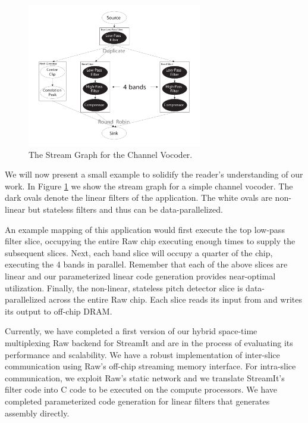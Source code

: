\documentclass{csailabstractbook}
\begin{document}
\begin{figure}[tbh]
	\vspace{-.2in}
  \centerline{\includegraphics[width=3.0in]{mgordon_figure1.pdf}}
	\vspace{-.2in}
  \caption{The Stream Graph for the Channel Vocoder.}
	\vspace{-.2in}
  \label{streamgraph}
\end{figure}


   
We will now present a small example to solidify the reader's
understanding of our work.  In Figure \ref{streamgraph} we show the
stream graph for a simple channel vocoder.  The dark ovals denote
the linear filters of the application.  The white ovals are non-linear
but stateless filters and thus can be data-parallelized.  

An example mapping of this application would first execute the top
low-pass filter slice, occupying the entire Raw chip executing enough
times to supply the subsequent slices. Next, each band slice will
occupy a quarter of the chip, executing the 4 bands in parallel.  Remember
that each of the above slices are linear and our parameterized linear
code generation provides near-optimal utilization. Finally, the
non-linear, stateless pitch detector slice is data-parallelized across
the entire Raw chip. Each slice reads its input from and writes its output
to off-chip DRAM.
 
Currently, we have completed a first version of our hybrid space-time
multiplexing Raw backend for StreamIt and are in the process of
evaluating its performance and scalability.  We have a robust
implementation of inter-slice communication using Raw's off-chip
streaming memory interface.  For intra-slice communication, we exploit
Raw's static network and we translate StreamIt's filter code into C
code to be executed on the compute processors.  We have completed
parameterized code generation for linear filters that generates
assembly directly.   
\end{document}
